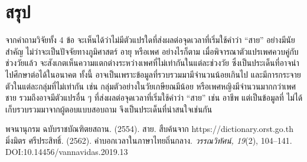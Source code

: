 \documentclass[a4paper]{article}
\begin{document}
\section{สรุป}
    จากคำถามวิจัยทั้ง 4 ข้อ จะเห็นได้ว่าไม่มีตัวแปรใดที่ส่งผลต่อจุดเวลาที่เริ่มใช้คำว่า “สาย” อย่างมีนัยสำคัญ ไม่ว่าจะเป็นปัจจัยทางภูมิศาสตร์ อายุ หรือเพศ อย่างไรก็ตาม เมื่อพิจารณาตัวแปรเพศควบคู่กับช่วงวัยแล้ว จะสังเกตเห็นความ\break แตกต่างระหว่างเพศที่ไม่เท่ากันในแต่ละช่วงวัย ซึ่งเป็นประเด็นที่อาจนำไปศึกษาต่อได้ในอนาคต ทั้งนี้ อาจเป็นเพราะข้อมูลที่รวบรวมมามีจำนวนน้อยเกินไป และมีการกระจายตัวในแต่ละกลุ่มที่ไม่เท่ากัน เช่น กลุ่มตัวอย่างในวัยเกษียณมีน้อย หรือเพศหญิงมีจำนวนมากกว่าเพศชาย รวมถึงอาจมีตัวแปรอื่น ๆ ที่ส่งผลต่อจุดเวลาที่เริ่มใช้คำว่า “สาย” เช่น อาชีพ แต่เป็นข้อมูลที่ ไม่ได้เก็บรวบรวมมาจากผู้ตอบแบบสอบถาม จึงเป็นประเด็นที่น่าสนใจเช่นกัน
\begin{thebibliography}{9}
     พจนานุกรม ฉบับราชบัณฑิตยสถาน. (2554). สาย. สืบค้นจาก https://dictionary.orst.go.th
     มิ่งมิตร ศรีประสิทธิ์. (2562). คำบอกเวลาในภาษาไทยถิ่นกลาง. \textit{วรรณวิทัศน์, 19}(2), 104–141. DOI:10.14456/vannavidas.2019.13
\end{thebibliography}
\end{document}
